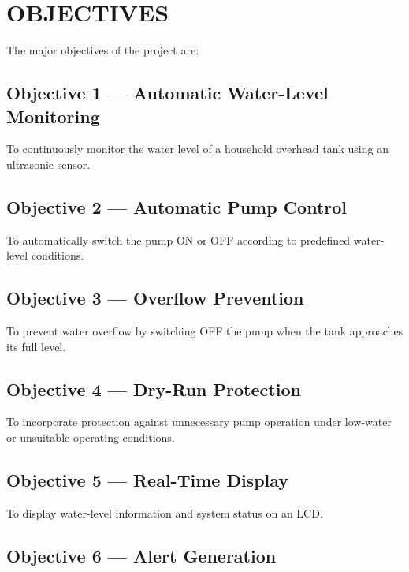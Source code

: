 \documentclass[12pt,a4paper]{article}
\begin{document}

\section{OBJECTIVES}

The major objectives of the project are:

\subsection*{Objective 1 --- Automatic Water-Level Monitoring}

To continuously monitor the water level of a household overhead tank using an ultrasonic sensor.

\subsection*{Objective 2 --- Automatic Pump Control}

To automatically switch the pump ON or OFF according to predefined water-level conditions.

\subsection*{Objective 3 --- Overflow Prevention}

To prevent water overflow by switching OFF the pump when the tank approaches its full level.

\subsection*{Objective 4 --- Dry-Run Protection}

To incorporate protection against unnecessary pump operation under low-water or unsuitable operating conditions.

\subsection*{Objective 5 --- Real-Time Display}

To display water-level information and system status on an LCD.

\subsection*{Objective 6 --- Alert Generation}
\end{document}
